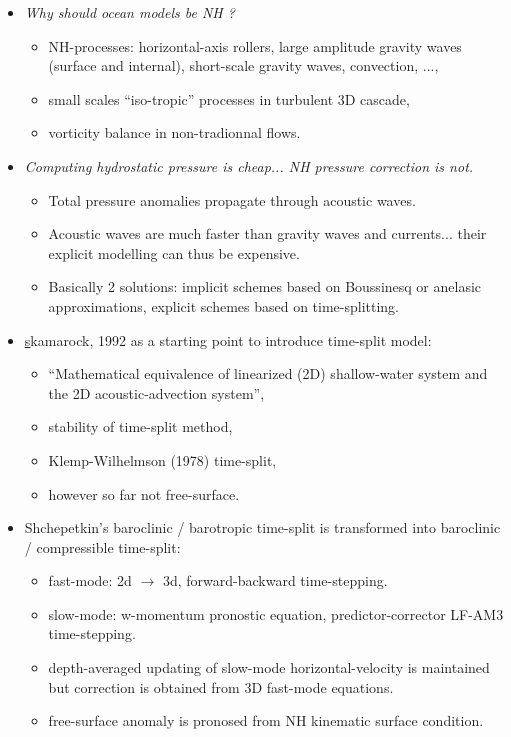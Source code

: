 \documentclass[a4paper,11pt]{article}
\begin{document}
\begin{itemize}
 \item \textit{Why should ocean models be NH ?}
 \begin{itemize}[label=\textbullet,font=\tiny]
  \item NH-processes: horizontal-axis rollers, large amplitude gravity waves (surface and internal),
  short-scale gravity waves, convection, ...,
  \item small scales ``iso-tropic'' processes in turbulent 3D cascade,
  \item vorticity balance in non-tradionnal flows.
 \end{itemize}
 \item \textit{Computing hydrostatic pressure is cheap... NH pressure correction is not.}
 \begin{itemize}[label=\textbullet,font=\tiny]
  \item Total pressure anomalies propagate through acoustic waves.
  \item Acoustic waves are much faster than gravity waves and currents... their explicit modelling can thus be expensive.
  \item Basically 2 solutions: implicit schemes based on Boussinesq or anelasic approximations, explicit schemes based on time-splitting.
 \end{itemize}
 \item \href{run:./Skamarock\_Time\_Splitting\_Divergence\_MWR_1992.pdf}
 skamarock, 1992 as a starting point to introduce time-split model: 
 \begin{itemize}[label=\textbullet,font=\tiny]
  \item ``Mathematical equivalence of linearized (2D) shallow-water system and the 2D acoustic-advection system'',
  \item stability of time-split method,
  \item Klemp-Wilhelmson (1978) time-split,
  \item however so far not free-surface.
 \end{itemize}
 \item Shchepetkin's baroclinic / barotropic time-split is transformed into baroclinic / compressible time-split:
 \begin{itemize}[label=\textbullet,font=\tiny]
  \item fast-mode: 2d $\rightarrow$ 3d, forward-backward time-stepping.
  \item slow-mode: w-momentum pronostic equation, predictor-corrector LF-AM3 time-stepping.
  \item depth-averaged updating of slow-mode horizontal-velocity is maintained but correction is obtained from 3D fast-mode equations.
  \item free-surface anomaly is pronosed from NH kinematic surface condition.
 \end{itemize}
\end{itemize}
\end{document}
